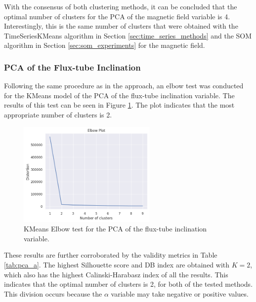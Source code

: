 With the consensus of both clustering methods, it can be concluded that the optimal number of clusters for the PCA of the magnetic field variable is 4. Interestingly, this is the same number of clusters that were obtained with the TimeSeriesKMeans algorithm in Section \ref{sec:time_series_methods} and the SOM algorithm in Section \ref{sec:som_experiments} for the magnetic field.

\subsubsection{PCA of the Flux-tube Inclination}\label{sec:pca_a}
Following the same procedure as in the approach, an elbow test was conducted for the KMeans model of the PCA of the flux-tube inclination variable. The results of this test can be seen in Figure \ref{fig:pca_a_elbow}. The plot indicates that the most appropriate number of clusters is 2.


\begin{figure}[h]
    \caption{KMeans Elbow test for the PCA of the flux-tube inclination variable.}
    \label{fig:pca_a_elbow}
    \centering
    \includegraphics[width=0.6\textwidth]{figures/pca_alpha_elbow_test.png}
\end{figure}

These results are further corroborated by the validity metrics in Table \ref{tab:pca_a}. The highest Silhouette score and DB index are obtained with $K=2$, which also has the highest Calinski-Harabasz index of all the results. This indicates that the optimal number of clusters is 2, for both of the tested methods. This division occurs because the $\alpha$ variable may take negative or positive values.

